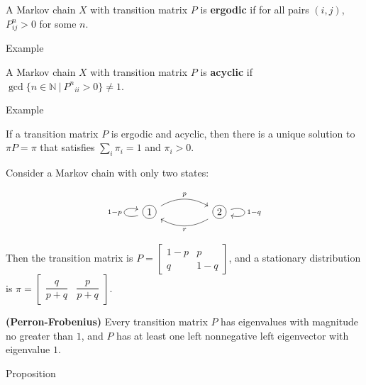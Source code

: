 \documentclass{article}
\newcommand*\circled[1]{\tikz[baseline=(char.base)]{
            \node[shape=circle,draw,inner sep=2pt] (char) {#1};}}
\theoremstyle{colontheorem}
\newenvironment{Theorem}
\newenvironment{Proposition}
\newenvironment{Def}
\newenvironment{Example}
\begin{document}
\begin{Def}
	
	A Markov chain $X$ with transition matrix $P$ is \textbf{ergodic} if for all pairs $(i, j)$, $P_{ij}^n > 0$ for some $n$.
	
\end{Def}



\begin{Def}
	
	A Markov chain $X$ with transition matrix $P$ is \textbf{acyclic} if $\gcd \{ n \in \mathbb{N}\ |\ {P^n}_{ii} > 0 \} \neq 1$.
	
\end{Def}



\begin{Proposition}
	
	If a transition matrix $P$ is ergodic and acyclic, then there is a unique solution to $\pi P = \pi$ that satisfies $\displaystyle\sum\limits_i \pi_i = 1$ and $\pi_i > 0$.
	
\end{Proposition}



\begin{Example}
	Consider a Markov chain with only two states:
	
	$$
		\begin{tikzcd}
			\circled{1} \arrow[l, "1-p", loop left] \arrow[rr, "p", bend left] & & \circled{2} \arrow[r, "1-q", loop right] \arrow[ll, "r", bend left]
		\end{tikzcd}
	$$
	
	Then the transition matrix is $P = \begin{bmatrix}
 		1 - p & p\\
 		q & 1 - q
 	\end{bmatrix}$, and a stationary distribution is $\pi = \begin{bmatrix}
 		\dfrac{q}{p + q} & \dfrac{p}{p + q}
 	\end{bmatrix}$.
	
\end{Example}



\begin{Theorem}
	
	\textbf{(Perron-Frobenius)} Every transition matrix $P$ has eigenvalues with magnitude no greater than $1$, and $P$ has at least one left nonnegative left eigenvector with eigenvalue $1$.
	
\end{Theorem}
\end{document}
